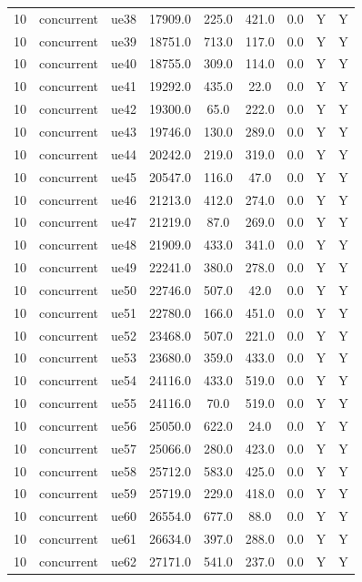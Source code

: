 \begin{table}[ht]
\begin{tabular}{|c|c|c|c|c|c|c|c|c|}
10 & concurrent & ue38 & 17909.0 & 225.0 & 421.0 & 0.0 & Y & Y \\
10 & concurrent & ue39 & 18751.0 & 713.0 & 117.0 & 0.0 & Y & Y \\
10 & concurrent & ue40 & 18755.0 & 309.0 & 114.0 & 0.0 & Y & Y \\
10 & concurrent & ue41 & 19292.0 & 435.0 & 22.0 & 0.0 & Y & Y \\
10 & concurrent & ue42 & 19300.0 & 65.0 & 222.0 & 0.0 & Y & Y \\
10 & concurrent & ue43 & 19746.0 & 130.0 & 289.0 & 0.0 & Y & Y \\
10 & concurrent & ue44 & 20242.0 & 219.0 & 319.0 & 0.0 & Y & Y \\
10 & concurrent & ue45 & 20547.0 & 116.0 & 47.0 & 0.0 & Y & Y \\
10 & concurrent & ue46 & 21213.0 & 412.0 & 274.0 & 0.0 & Y & Y \\
10 & concurrent & ue47 & 21219.0 & 87.0 & 269.0 & 0.0 & Y & Y \\
10 & concurrent & ue48 & 21909.0 & 433.0 & 341.0 & 0.0 & Y & Y \\
10 & concurrent & ue49 & 22241.0 & 380.0 & 278.0 & 0.0 & Y & Y \\
10 & concurrent & ue50 & 22746.0 & 507.0 & 42.0 & 0.0 & Y & Y \\
10 & concurrent & ue51 & 22780.0 & 166.0 & 451.0 & 0.0 & Y & Y \\
10 & concurrent & ue52 & 23468.0 & 507.0 & 221.0 & 0.0 & Y & Y \\
10 & concurrent & ue53 & 23680.0 & 359.0 & 433.0 & 0.0 & Y & Y \\
10 & concurrent & ue54 & 24116.0 & 433.0 & 519.0 & 0.0 & Y & Y \\
10 & concurrent & ue55 & 24116.0 & 70.0 & 519.0 & 0.0 & Y & Y \\
10 & concurrent & ue56 & 25050.0 & 622.0 & 24.0 & 0.0 & Y & Y \\
10 & concurrent & ue57 & 25066.0 & 280.0 & 423.0 & 0.0 & Y & Y \\
10 & concurrent & ue58 & 25712.0 & 583.0 & 425.0 & 0.0 & Y & Y \\
10 & concurrent & ue59 & 25719.0 & 229.0 & 418.0 & 0.0 & Y & Y \\
10 & concurrent & ue60 & 26554.0 & 677.0 & 88.0 & 0.0 & Y & Y \\
10 & concurrent & ue61 & 26634.0 & 397.0 & 288.0 & 0.0 & Y & Y \\
10 & concurrent & ue62 & 27171.0 & 541.0 & 237.0 & 0.0 & Y & Y \\

\end{tabular}
\end{table}
